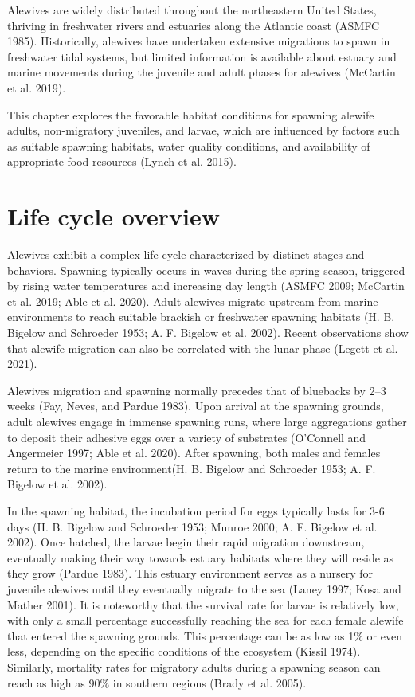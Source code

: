 \documentclass[
]{book}
\begin{document}
Alewives are widely distributed throughout the northeastern United States, thriving in freshwater rivers and estuaries along the Atlantic coast (ASMFC 1985).
Historically, alewives have undertaken extensive migrations to spawn in freshwater tidal systems, but limited information is available about estuary and marine movements during the juvenile and adult phases for alewives (McCartin et al. 2019).

This chapter explores the favorable habitat conditions for spawning alewife adults, non-migratory juveniles, and larvae, which are influenced by factors such as suitable spawning habitats, water quality conditions, and availability of appropriate food resources (Lynch et al. 2015).

\hypertarget{life-cycle-overview}{%
\section{Life cycle overview}\label{life-cycle-overview}}

Alewives exhibit a complex life cycle characterized by distinct stages and behaviors.
Spawning typically occurs in waves during the spring season, triggered by rising water temperatures and increasing day length (ASMFC 2009; McCartin et al. 2019; Able et al. 2020).
Adult alewives migrate upstream from marine environments to reach suitable brackish or freshwater spawning habitats (H. B. Bigelow and Schroeder 1953; A. F. Bigelow et al. 2002).
Recent observations show that alewife migration can also be correlated with the lunar phase (Legett et al. 2021).

Alewives migration and spawning normally precedes that of bluebacks by 2--3 weeks (Fay, Neves, and Pardue 1983).
Upon arrival at the spawning grounds, adult alewives engage in immense spawning runs, where large aggregations gather to deposit their adhesive eggs over a variety of substrates (O'Connell and Angermeier 1997; Able et al. 2020).
After spawning, both males and females return to the marine environment(H. B. Bigelow and Schroeder 1953; A. F. Bigelow et al. 2002).

In the spawning habitat, the incubation period for eggs typically lasts for 3-6 days (H. B. Bigelow and Schroeder 1953; Munroe 2000; A. F. Bigelow et al. 2002).
Once hatched, the larvae begin their rapid migration downstream, eventually making their way towards estuary habitats where they will reside as they grow (Pardue 1983).
This estuary environment serves as a nursery for juvenile alewives until they eventually migrate to the sea (Laney 1997; Kosa and Mather 2001).
It is noteworthy that the survival rate for larvae is relatively low, with only a small percentage successfully reaching the sea for each female alewife that entered the spawning grounds.
This percentage can be as low as 1\% or even less, depending on the specific conditions of the ecosystem (Kissil 1974).
Similarly, mortality rates for migratory adults during a spawning season can reach as high as 90\% in southern regions (Brady et al. 2005).
\end{document}
